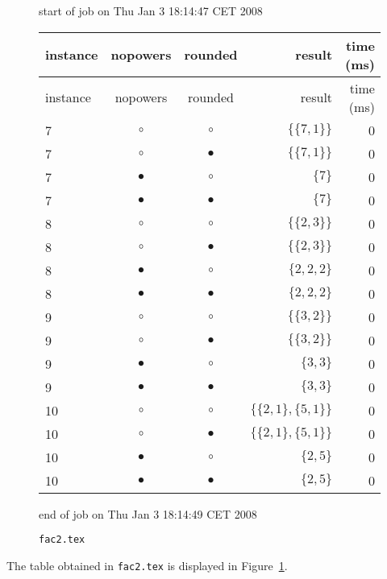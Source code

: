 \documentclass[a4paper]{article}
\def\co{,}\def\<{\langle}\def\>{\rangle}\def\d{\hbox{\rm d}}
\begin{document}
\begin{figure}[t]
\begin{center}
{\begin{minipage}{0.95\textwidth}
        \noindent start of job on  Thu Jan 3 18:14:47 CET 2008
        \noindent\begin{longtable}{lccrr}
          \hline
          instance & nopowers & rounded & result & time (ms)\\
          \hline
          \endfirsthead
          \hline
          instance & nopowers & rounded & result & time (ms)\\
          \hline
          \endhead
          \hline
          7 &  $\circ$  &  $\circ$  & $\{\{7\co 1\}\}$ & 0\\
          7 &  $\circ$  & $\bullet$ & $\{\{7\co 1\}\}$ & 0\\
          7 & $\bullet$ &  $\circ$  & $\{7\}$ & 0\\
          7 & $\bullet$ & $\bullet$ & $\{7\}$ & 0\\
          \hline
          8 &  $\circ$  &  $\circ$  & $\{\{2\co 3\}\}$ & 0\\
          8 &  $\circ$  & $\bullet$ & $\{\{2\co 3\}\}$ & 0\\
          8 & $\bullet$ &  $\circ$  & $\{2\co 2\co 2\}$ & 0\\
          8 & $\bullet$ & $\bullet$ & $\{2\co 2\co 2\}$ & 0\\
          \hline
          9 &  $\circ$  &  $\circ$  & $\{\{3\co 2\}\}$ & 0\\
          9 &  $\circ$  & $\bullet$ & $\{\{3\co 2\}\}$ & 0\\
          9 & $\bullet$ &  $\circ$  & $\{3\co 3\}$ & 0\\
          9 & $\bullet$ & $\bullet$ & $\{3\co 3\}$ & 0\\
          \hline
          10 &  $\circ$  &  $\circ$  & $\{\{2\co 1\}\co \{5\co 1\}\}$ & 0\\
          10 &  $\circ$  & $\bullet$ & $\{\{2\co 1\}\co \{5\co 1\}\}$ & 0\\
          10 & $\bullet$ &  $\circ$  & $\{2\co 5\}$ & 0\\
          10 & $\bullet$ & $\bullet$ & $\{2\co 5\}$ & 0\\
          \hline
        \end{longtable}
        \noindent end of job on  Thu Jan 3 18:14:49 CET 2008
      \end{minipage}}
    \caption{\texttt{fac2.tex}\label{FI:fac2}}
  \end{center}
\end{figure}
The table obtained in \texttt{fac2.tex} is displayed in
Figure~\ref{FI:fac2}.
\end{document}
